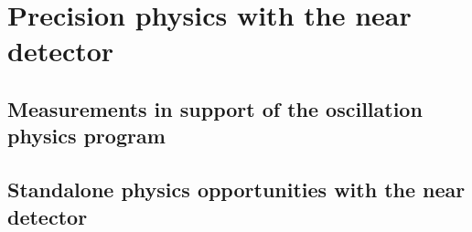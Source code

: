 \chapter{Precision physics with the near detector}
\label{ch:prec-nd}


\section{Measurements in support of the oscillation physics program}
\label{sec:prec-nd-support}


\section{Standalone physics opportunities with the near detector}
\label{sec:prec-nd-standalone}